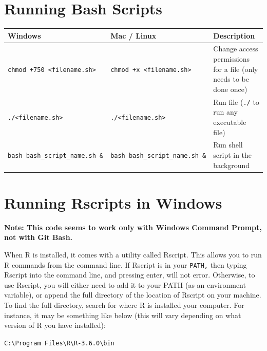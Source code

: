 \documentclass[
]{book}
\begin{document}
\hypertarget{running-bash-scripts}{%
\section{Running Bash Scripts}\label{running-bash-scripts}}

\begin{longtable}[]{@{}
  >{\raggedright\arraybackslash}p{}
  >{\raggedright\arraybackslash}p{}
  >{\raggedright\arraybackslash}p{}@{}}
\toprule
Windows & Mac / Linux & Description \\
\midrule
\endhead
\texttt{chmod\ +750\ \textless{}filename.sh\textgreater{}} & \texttt{chmod\ +x\ \textless{}filename.sh\textgreater{}} & Change access permissions for a file (only needs to be done once) \\
\texttt{./\textless{}filename.sh\textgreater{}} & \texttt{./\textless{}filename.sh\textgreater{}} & Run file (\texttt{./} to run any executable file) \\
\texttt{bash\ bash\_script\_name.sh\ \&} & \texttt{bash\ bash\_script\_name.sh\ \&} & Run shell script in the background \\
\bottomrule
\end{longtable}

\hypertarget{running-rscripts-in-windows}{%
\section{Running Rscripts in Windows}\label{running-rscripts-in-windows}}

\textbf{Note: This code seems to work only with Windows Command Prompt, not with Git Bash.}

When R is installed, it comes with a utility called Rscript. This allows you to run R commands from the command line. If Rscript is in your \texttt{PATH,} then typing Rscript into the command line, and pressing enter, will not error. Otherwise, to use Rscript, you will either need to add it to your PATH (as an environment variable), or append the full directory of the location of Rscript on your machine. To find the full directory, search for where R is installed your computer. For instance, it may be something like below (this will vary depending on what version of R you have installed):

\texttt{C:\textbackslash{}Program\ Files\textbackslash{}R\textbackslash{}R-3.6.0\textbackslash{}bin}
\end{document}
